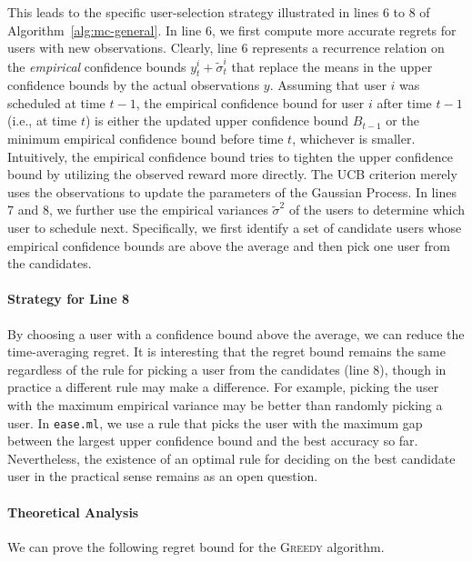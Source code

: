 \documentclass[letterpaper]{vldb}
\newcommand{\eml}{\texttt{ease.ml}\xspace}
\newcommand{\greedy}{\textsc{Greedy}\xspace}
\begin{document}
This leads to the specific user-selection strategy illustrated in lines 6 to 8 of Algorithm~\ref{alg:mc-general}.
In line 6, we first compute more accurate regrets for users with new observations.
Clearly, line 6 represents a recurrence relation on the \emph{empirical} confidence bounds $y^i_{t}+ \tilde{\sigma}^{i}_{t}$ that replace the means in the upper confidence bounds by the actual observations $y$.
Assuming that user $i$ was scheduled at time $t-1$, the empirical confidence bound for user $i$ after time $t-1$ (i.e., at time $t$) is either the updated upper confidence bound $B_{t-1}$
or the minimum empirical confidence bound before time $t$, whichever is smaller.
Intuitively, the empirical confidence bound tries to tighten the upper confidence bound by utilizing the observed reward more directly. The UCB criterion merely uses the observations to update the parameters of the Gaussian Process.
In lines 7 and 8, we further use the empirical variances $\tilde{\sigma}^2$ of the users to determine which user to schedule next.
Specifically, we first identify a set of candidate users whose empirical confidence bounds are above the average and then pick one user from the candidates.

\paragraph*{Strategy for Line 8}
By choosing a user with a confidence bound above the average, we can reduce the time-averaging regret.
It is interesting that the regret bound remains the same regardless of the rule for picking a user from the candidates (line 8), though in practice a different rule may make a difference.
For example, picking the user with the maximum empirical variance may be better than randomly picking a user. In \eml, we 
use a rule that picks the user with the maximum
gap between the largest upper confidence bound
and the best accuracy so far.
Nevertheless, the existence of an optimal rule for deciding on the best candidate user in the practical sense remains as an open question.

\paragraph*{Theoretical Analysis} We
can prove the following regret bound
for the \greedy algorithm.
\end{document}
